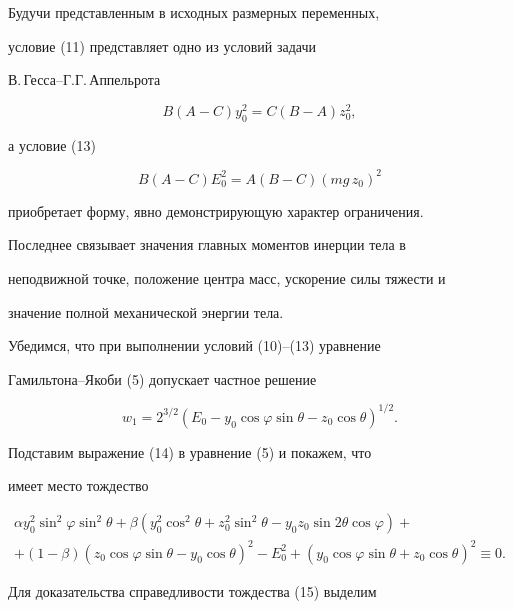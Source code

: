 Будучи представленным в исходных размерных переменных,


условие (11) представляет одно из условий задачи


В.\,Гесса--Г.Г.\,Аппельрота


$$


B(A-C)y^2_0=C(B-A)z^2_0,


$$


а условие (13)


$$


B(A-C)E^2_0=A(B-C)(mg\,z_0)^2


$$


приобретает форму, явно демонстрирующую характер ограничения.


Последнее связывает значения главных моментов инерции тела в


неподвижной точке, положение центра масс, ускорение силы тяжести и


значение полной механической энергии тела.





Убедимся, что при выполнении условий (10)--(13) уравнение


Гамильтона--Якоби (5) допускает частное решение


\begin{equation}


w_1=2^{3/2}(E_0-y_0\cos\varphi\sin\theta-


z_0\cos\theta)^{1/2}.


\end{equation}





Подставим выражение (14) в уравнение (5) и покажем, что


имеет место тождество


\begin{multline}


\alpha y^2_0\sin^2\varphi\sin^2\theta+\beta(y^2_0\cos^2\theta


+z^2_0\sin^2\theta-y_0z_0\sin 2\theta\cos\varphi)+\\


+(1-\beta)(z_0\cos\varphi\sin\theta-y_0\cos\theta)^2


-E^2_0+(y_0\cos\varphi\sin\theta+


z_0\cos\theta)^2\equiv 0.


\end{multline}


Для доказательства справедливости тождества (15) выделим


